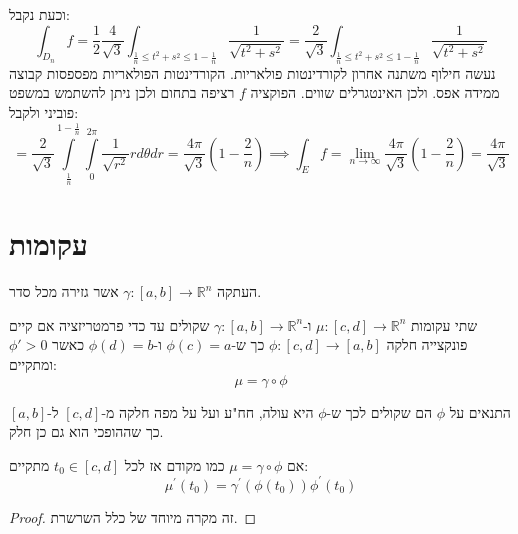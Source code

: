 \documentclass{tstextbook}
\begin{document}
וכעת נקבל:
$$\int_{D_{n}}f={\frac{1}{2}}{\frac{4}{\sqrt{3}}}\int_{{\frac{1}{n}}\leq t^{2}+s^{2}\leq1-{\frac{1}{n}}}{\frac{1}{\sqrt{t^{2}+s^{2}}}}={\frac{2}{\sqrt{3}}}\int_{{\frac{1}{n}}\leq t^{2}+s^{2}\leq1-{\frac{1}{n}}}{\frac{1}{\sqrt{t^{2}+s^{2}}}}$$
נעשה חילוף משתנה אחרון לקורדינטות פולאריות. הקורדינטות הפולאריות מפספסות קבוצה ממידה אפס. ולכן האינטגרלים שווים. הפוקציה \(f\) רציפה בתחום ולכן ניתן להשתמש במשפט פוביני ולקבל:
$$=\frac{2}{\sqrt{3}}\int\limits_{\frac{1}{n}}^{1-\frac{1}{n}}\int\limits_{0}^{2\pi}\frac{1}{\sqrt{r^{2}}}r d\theta d r=\frac{4\pi}{\sqrt{3}}\left( 1-\frac{2}{n} \right)\implies\int_{E}f=\operatorname*{lim}_{n\to\infty}{\frac{4\pi}{\sqrt{3}}}\left( 1-{\frac{2}{n}} \right)={\frac{4\pi}{\sqrt{3}}}$$


\section{עקומות}

\begin{definition}
העתקה \(\gamma:[a,b]\to \mathbb{R}^{n}\) אשר גזירה מכל סדר.

\end{definition}
\begin{definition}
שתי עקומות \(\mu:[c,d]\to \mathbb{R}^{n}\) ו-\(\gamma:[a,b]\to \mathbb{R}^{n}\) שקולים עד כדי פרמטריזציה אם קיים פונקצייה חלקה \(\phi:[c,d]\to[a,b]\) כך ש-\(\phi(c)=a\) ו-\(\phi(d)=b\) כאשר \(\phi'>0\) ומתקיים:
$$\mu=\gamma \circ  \phi$$

\end{definition}
\begin{remark}
התנאים על \(\phi\) הם שקולים לכך ש-\(\phi\) היא עולה, חח"ע ועל על מפה חלקה מ-\([c,d]\) ל-\([a,b]\) כך שההופכי הוא גם כן חלק.

\end{remark}
\begin{proposition}
אם \(\mu=\gamma \circ\phi\) כמו מקודם אז לכל \(t_{0} \in [c,d]\) מתקיים:
$$\mu^{\prime}(t_{0})=\gamma^{\prime}(\phi(t_{0}))\phi^{\prime}(t_{0})$$

\end{proposition}
\begin{proof}
זה מקרה מיוחד של כלל השרשרת.

\end{proof}
\end{document}
